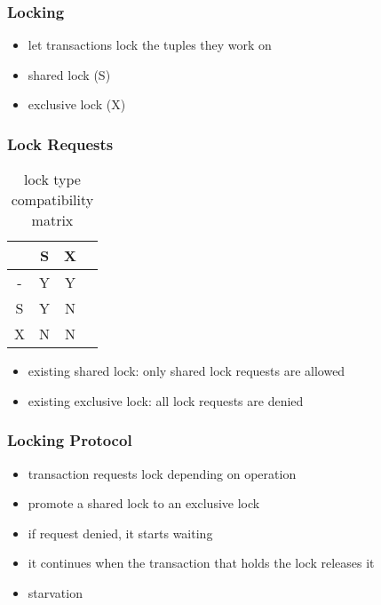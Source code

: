 \documentclass[dvipsnames]{beamer}
\theoremstyle{plain}
\begin{document}
\begin{frame}
  \frametitle{Locking}

  \begin{itemize}
    \item let transactions lock the tuples they work on

    \medskip
    \item \alert{shared} lock (S)
    \item \alert{exclusive} lock (X)
  \end{itemize}
\end{frame}

\begin{frame}
  \frametitle{Lock Requests}

  \begin{table}
    \caption{lock type compatibility matrix}
    \begin{tabular}{|c||c|c|c|}\hline
  & S & X\\\hline\hline
- & Y & Y\\\hline
S & Y & N\\\hline
X & N & N\\\hline
    \end{tabular}
  \end{table}

  \medskip
  \begin{itemize}
    \item existing shared lock: only shared lock requests are allowed
    \item existing exclusive lock: all lock requests are denied
  \end{itemize}
\end{frame}

\begin{frame}
  \frametitle{Locking Protocol}

  \begin{itemize}
    \item transaction requests lock depending on operation
    \item promote a shared lock to an exclusive lock

    \medskip
    \item if request denied, it starts waiting
    \item it continues when the transaction that holds the lock releases it

    \medskip
    \item \alert{starvation}
  \end{itemize}
\end{frame}
\end{document}

